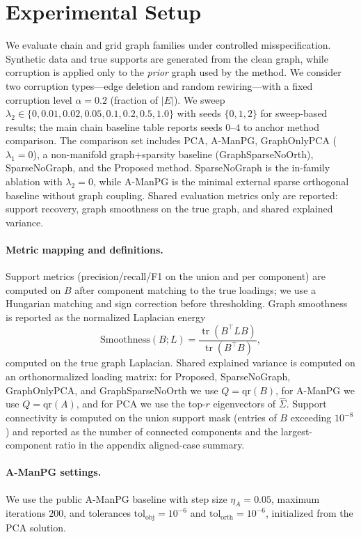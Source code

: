 \documentclass[10pt,twocolumn,letterpaper]{article}
\theoremstyle{definition}
\newcommand{\Sigmahat}{\widehat{\Sigma}}
\DeclareMathOperator{\tr}{tr}
\begin{document}
\section{Experimental Setup}
\label{sec:experiments}

We evaluate chain and grid graph families under controlled misspecification. Synthetic data and true supports are generated from the clean graph, while corruption is applied only to the \emph{prior} graph used by the method. We consider two corruption types---edge deletion and random rewiring---with a fixed corruption level $\alpha=0.2$ (fraction of $|E|$). We sweep $\lambda_2 \in \{0, 0.01, 0.02, 0.05, 0.1, 0.2, 0.5, 1.0\}$ with seeds $\{0,1,2\}$ for sweep-based results; the main chain baseline table reports seeds $0$--$4$ to anchor method comparison. The comparison set includes PCA, A-ManPG, GraphOnlyPCA ($\lambda_1=0$), a non-manifold graph+sparsity baseline (GraphSparseNoOrth), SparseNoGraph, and the Proposed method. SparseNoGraph is the in-family ablation with $\lambda_2=0$, while A-ManPG is the minimal external sparse orthogonal baseline without graph coupling. Shared evaluation metrics only are reported: support recovery, graph smoothness on the true graph, and shared explained variance.

\paragraph{Metric mapping and definitions.}
Support metrics (precision/recall/F1 on the union and per component) are computed on $B$ after component matching to the true loadings; we use a Hungarian matching and sign correction before thresholding. Graph smoothness is reported as the normalized Laplacian energy
\[
\mathrm{Smoothness}(B;L) = \frac{\tr(B^\top L B)}{\tr(B^\top B)},
\]
computed on the true graph Laplacian. Shared explained variance is computed on an orthonormalized loading matrix: for Proposed, SparseNoGraph, GraphOnlyPCA, and GraphSparseNoOrth we use $Q=\mathrm{qr}(B)$, for A-ManPG we use $Q=\mathrm{qr}(A)$, and for PCA we use the top-$r$ eigenvectors of $\Sigmahat$. Support connectivity is computed on the union support mask (entries of $B$ exceeding $10^{-8}$) and reported as the number of connected components and the largest-component ratio in the appendix aligned-case summary.

\paragraph{A-ManPG settings.}
We use the public A-ManPG baseline with step size $\eta_A=0.05$, maximum iterations $200$, and tolerances $\text{tol}_{\mathrm{obj}}=10^{-6}$ and $\text{tol}_{\mathrm{orth}}=10^{-6}$, initialized from the PCA solution.
\end{document}
